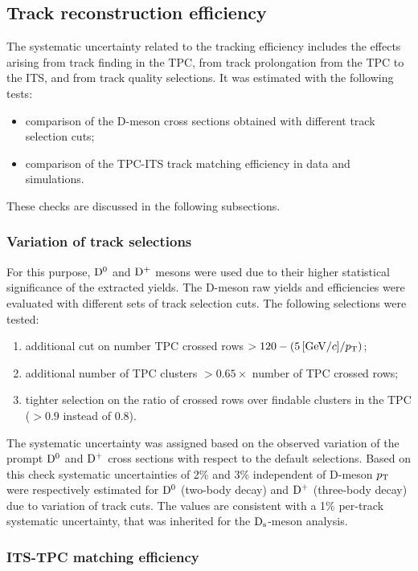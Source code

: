 \subsection{Track reconstruction efficiency}
\label{sec:TrackEffSystPP}
The systematic uncertainty related to the tracking efficiency includes the 
effects arising from track finding in the TPC, from track prolongation  
from the TPC to the ITS, and from track quality selections.
It was estimated with the following tests:
\begin{itemize}
\item comparison of the D-meson cross sections obtained with different track selection cuts;
\item comparison of the TPC-ITS track matching efficiency in data and simulations.
\end{itemize}
These checks are discussed in the following subsections.

\subsubsection{Variation of track selections}
For this purpose, ${\rm D^0}$ and ${\rm D^+}$ mesons were used due to their
higher statistical significance of the extracted yields.
The D-meson raw yields and efficiencies were evaluated with 
different sets of track selection cuts.
The following selections were tested:
\begin{enumerate}
\item additional cut on number TPC crossed rows $> 120-(5\, [ \mathrm{GeV}/c ]/p_{\rm T})$;
\item additional number of TPC clusters $>0.65 \times$ number of TPC crossed rows;
\item tighter selection on the ratio of crossed rows over findable clusters in the TPC ($>0.9$ instead of 0.8).
\end{enumerate}
The systematic uncertainty was assigned based on the observed variation of
the prompt ${\rm D^0}$ and ${\rm D^+}$ cross sections with respect to the default selections.
Based on this check systematic uncertainties of 2\% and 3\% independent of D-meson $p_{\rm T}$ were 
respectively estimated for ${\rm D^0}$ (two-body decay) and ${\rm D^+}$ (three-body decay) 
due to variation of track cuts. The values are consistent with a 1\% per-track systematic
uncertainty, that was inherited for the ${\rm D_s}$-meson analysis.

\subsubsection{ITS-TPC matching efficiency}

